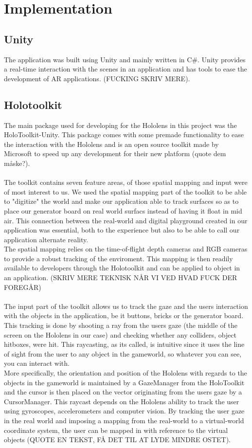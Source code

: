 \section{Implementation}

\subsection{Unity}
The application was built using Unity and mainly written in C#. Unity provides a real-time interaction with the scenes in an application and has tools to ease the development of AR applications. (FUCKING SKRIV MERE).

\subsection{Holotoolkit}
The main package used for developing for the Hololens in this project was the HoloToolkit-Unity. This package comes with some premade functionality to ease the interaction with the Hololens and is an open source toolkit made by Microsoft to speed up any development for their new platform (quote dem måske?).\\
\\
The toolkit contains seven feature areas, of those spatial mapping and input were of most interest to us. We used the spatial mapping part of the toolkit to be able to "digitize" the world and make our application able to track surfaces so as to place our generator board on real world surfacs instead of having it float in mid air. This connection between the real-world and digital playground created in our application was essential, both to the experience but also to be able to call our application alternate reality.\\
The spatial mapping relies on the time-of-flight depth cameras and RGB cameras to provide a robust tracking of the enviroment. This mapping is then readily available to developers through the Holotoolkit and can be applied to object in an application.
(SKRIV MERE TEKNISK NÅR VI VED HVAD FUCK DER FOREGÅR) 
\\\\
The input part of the toolkit allows us to track the gaze and the users interaction with the objects in the application, be it buttons, bricks or the generator board. This tracking is done by shooting a ray from the users gaze (the middle of the screen on the Hololens in our case) and checking whether any colliders, object hitboxes, were hit. This raycasting, as its called, is intuitive since it uses the line of sight from the user to any object in the gameworld, so whatever you can see, you can interact with.\\
More specifically, the orientation and position of the Hololens with regards to the objects in the gameworld is maintained by a GazeManager from the HoloToolkit and the cursor is then placed on the vector originating from the users gaze by a CursorManager. This raycast depends on the Hololens ability to track the user using gyroscopes, accelerometers and computer vision. By tracking the user gaze in the real world and imposing a mapping from the real-world to a virtual-world coordinate system, the user can be mapped in with reference to the virtual objects (QUOTE EN TEKST, FÅ DET TIL AT LYDE MINDRE OSTET). 